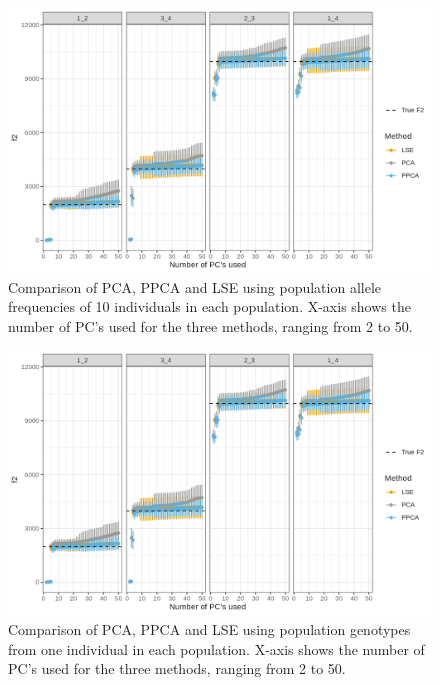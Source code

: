 \documentclass[12pt, letterpaper]{article}
\begin{document}
\begin{figure}[ht!]
    \includegraphics[width=16.5cm]{plots/supplementary/Ne1000_split_times1000_npop10_nind100_mu0_f2_plot_scale_test_ind.png}
    \centering
    \caption{Comparison of PCA, PPCA and LSE using population allele frequencies of 10 individuals in each population. X-axis shows the number of PC's used for the three methods, ranging from 2 to 50.}
    \label{figS1:pc_scale}
\end{figure}


\begin{figure}[ht!]
    \includegraphics[width=16.5cm]{plots/supplementary/Ne1000_split_times1000_npop10_nind100_mu0_f2_plot_scale_test_ind.png}
    \centering
    \caption{Comparison of PCA, PPCA and LSE using population genotypes from one individual in each population. X-axis shows the number of PC's used for the three methods, ranging from 2 to 50.}
    \label{figS2:pc_scale}
\end{figure}
\end{document}
